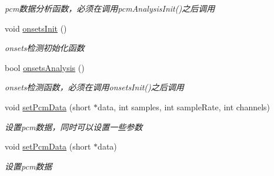 \begin{DoxyCompactItemize}
\begin{DoxyCompactList}\small\item\em pcm数据分析函数，必须在调用pcm\-Analysis\-Init()之后调用 \end{DoxyCompactList}\item 
\hypertarget{classMusicAnalysis_af44f11b664c059a825abf6a35427ebe7}{void \hyperlink{classMusicAnalysis_af44f11b664c059a825abf6a35427ebe7}{onsets\-Init} ()}\label{classMusicAnalysis_af44f11b664c059a825abf6a35427ebe7}

\begin{DoxyCompactList}\small\item\em onsets检测初始化函数 \end{DoxyCompactList}\item 
\hypertarget{classMusicAnalysis_a79c0914b83e93ece950ca436c97e72b9}{bool \hyperlink{classMusicAnalysis_a79c0914b83e93ece950ca436c97e72b9}{onsets\-Analysis} ()}\label{classMusicAnalysis_a79c0914b83e93ece950ca436c97e72b9}

\begin{DoxyCompactList}\small\item\em onsets检测函数，必须在调用onsets\-Init()之后调用 \end{DoxyCompactList}\item 
\hypertarget{classMusicAnalysis_a3ed29f61608c75ace4dc89a79febc159}{void \hyperlink{classMusicAnalysis_a3ed29f61608c75ace4dc89a79febc159}{set\-Pcm\-Data} (short $\ast$data, int samples, int sample\-Rate, int channels)}\label{classMusicAnalysis_a3ed29f61608c75ace4dc89a79febc159}

\begin{DoxyCompactList}\small\item\em 设置pcm数据，同时可以设置一些参数 \end{DoxyCompactList}\item 
\hypertarget{classMusicAnalysis_aaf5e486fb8a929a6b6391385c28542eb}{void \hyperlink{classMusicAnalysis_aaf5e486fb8a929a6b6391385c28542eb}{set\-Pcm\-Data} (short $\ast$data)}\label{classMusicAnalysis_aaf5e486fb8a929a6b6391385c28542eb}

\begin{DoxyCompactList}\small\item\em 设置pcm数据 \end{DoxyCompactList}\end{DoxyCompactItemize}


